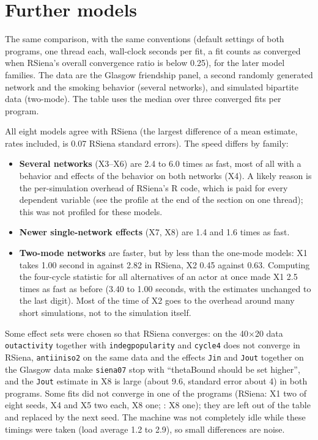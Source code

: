\section{Further models}\label{sec:benchextra}

The same comparison, with the same conventions (default settings of both programs, one thread each, wall-clock seconds per fit, a fit counts as converged when RSiena's overall convergence ratio is below 0.25), for the later model families. The data are the Glasgow friendship panel, a second randomly generated network and the smoking behavior (several networks), and simulated bipartite data (two-mode). The table uses the median over three converged fits per program.



All eight models agree with RSiena (the largest difference of a mean estimate, rates included, is 0.07 RSiena standard errors). The speed differs by family:
\begin{itemize}
\item \textbf{Several networks} (X3--X6) are 2.4 to 6.0 times as fast, most of all with a behavior and effects of the behavior on both networks (X4). A likely reason is the per-simulation overhead of RSiena's R code, which is paid for every dependent variable (see the profile at the end of the section on one thread); this was not profiled for these models.
\item \textbf{Newer single-network effects} (X7, X8) are 1.4 and 1.6 times as fast.
\item \textbf{Two-mode networks} are faster, but by less than the one-mode models: X1 takes 1.00 second in \nwsaom{} against 2.82 in RSiena, X2 0.45 against 0.63. Computing the four-cycle statistic for all alternatives of an actor at once made X1 2.5 times as fast as before (3.40 to 1.00 seconds, with the estimates unchanged to the last digit). Most of the time of X2 goes to the overhead around many short simulations, not to the simulation itself.
\end{itemize}
Some effect sets were chosen so that RSiena converges: on the 40$\times$20 data \texttt{outactivity} together with \texttt{indegpopularity} and \texttt{cycle4} does not converge in RSiena, \texttt{antiiniso2} on the same data and the effects \texttt{Jin} and \texttt{Jout} together on the Glasgow data make \texttt{siena07} stop with ``thetaBound should be set higher'', and the \texttt{Jout} estimate in X8 is large (about 9.6, standard error about 4) in both programs. Some fits did not converge in one of the programs (RSiena: X1 two of eight seeds, X4 and X5 two each, X8 one; \nwsaom{}: X8 one); they are left out of the table and replaced by the next seed. The machine was not completely idle while these timings were taken (load average 1.2 to 2.9), so small differences are noise.

